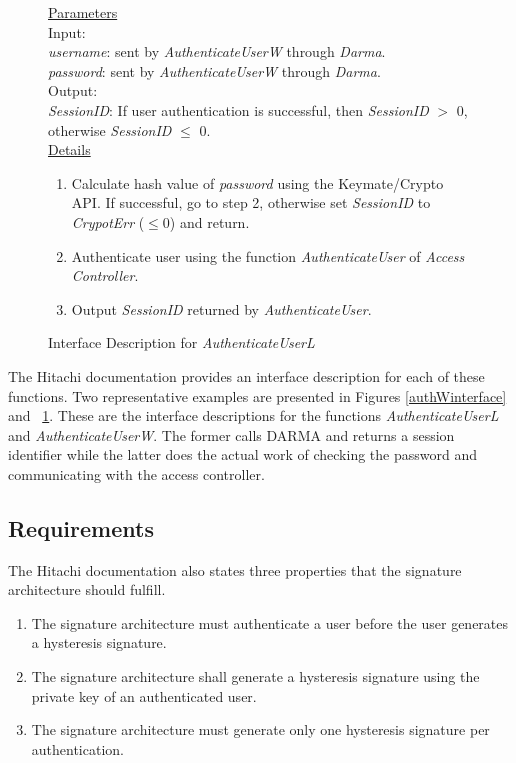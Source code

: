 \documentclass[a4paper,pdftex]{article}
\newcommand{\sigsys}{signature architecture}
\newcommand{\AuthenticateUserW}{\emph{AuthenticateUserW}}
\newcommand{\AuthenticateUserL}{\emph{AuthenticateUserL}}
\newcommand{\AccessController}{\emph{Access Controller}}
\newcommand{\Darma}{\emph{Darma}}
\newcommand{\AuthenticateUser}{\emph{AuthenticateUser}}
\newcommand{\SessionID}{\emph{SessionID}}
\newcommand{\username}{\emph{username}}
\newcommand{\password}{\emph{password}}
\newcommand{\CrypotErr}{\emph{CrypotErr}}
\newcommand{\oneindent}{\hspace*{10pt}}
\newcommand{\twoindent}{\hspace*{20pt}}
\begin{document}
\begin{figure}[t]
\begin{small}
\underline{Parameters}\\
\oneindent Input:\\
\twoindent \username:   sent by \AuthenticateUserW{} through \Darma.\\
\twoindent \password :  sent by \AuthenticateUserW{} through \Darma.\\
\oneindent Output:\\
\twoindent \SessionID:   If user authentication is successful, then \SessionID{} $>$ 0,  \\
\hspace*{67pt}                otherwise \SessionID{} $\leq$ 0. \\[10pt]
\underline{Details} 
\begin{enumerate} \itemsep=2pt
\item Calculate hash value of \password{} using the Keymate/Crypto API.
         If successful, go to step 2, otherwise set \SessionID{} to
\CrypotErr{} ($\leq$0) and return.
\item Authenticate user using the function \AuthenticateUser{} of
\AccessController.
\item Output \SessionID{} returned by \AuthenticateUser.
\end{enumerate}
\end{small}
\caption{Interface Description for \AuthenticateUserL \label{authLinterface}}
\end{figure}


The Hitachi documentation provides an interface description for each of
these functions.  Two representative examples are presented in
Figures \ref{authWinterface} and ~\ref{authLinterface}. These are the
interface descriptions for the functions \AuthenticateUserL{} and
\AuthenticateUserW{}.  The former calls DARMA and returns a
session identifier while the latter does the actual work of checking the
password and communicating with the access controller.

\subsection{Requirements} \label{req-sec}
The Hitachi documentation also states three properties that the \sigsys{} should fulfill.
\begin{enumerate}  \itemsep=2pt
\item The \sigsys{} must authenticate
a user before the user generates a hysteresis signature.
\item The \sigsys{} shall generate a hysteresis signature using the private key of
an authenticated user.
\item The \sigsys{}  must generate only one hysteresis signature per authentication.
\end{enumerate}
\end{document}
